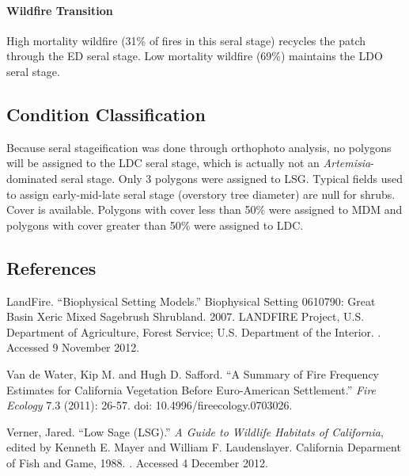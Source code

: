 \paragraph{Wildfire Transition} High mortality wildfire (31\% of fires in this seral stage) recycles the patch through the ED seral stage. Low mortality wildfire (69\%) maintains the LDO seral stage.

\noindent\hrulefill

\subsection*{Condition Classification}
Because seral stageification was done through orthophoto analysis, no polygons will be assigned to the LDC seral stage, which is actually not an \emph{Artemisia}-dominated seral stage. Only 3 polygons were assigned to LSG. Typical fields used to assign early-mid-late seral stage (overstory tree diameter) are null for shrubs. Cover is available. Polygons with cover less than 50\% were assigned to MDM and polygons with cover greater than 50\% were assigned to LDC.


\subsection*{References}

\begin{hangparas}{.25in}{1} 
LandFire. ``Biophysical Setting Models.'' Biophysical Setting 0610790: Great Basin Xeric Mixed Sagebrush Shrubland. 2007. LANDFIRE Project, U.S. Department of Agriculture, Forest Service; U.S. Department of the Interior. . Accessed 9 November 2012.

Van de Water, Kip M. and Hugh D. Safford. ``A Summary of Fire Frequency Estimates for California Vegetation Before Euro-American Settlement.'' \emph{Fire Ecology} 7.3 (2011): 26-57. doi: 10.4996/fireecology.0703026.

Verner, Jared. ``Low Sage (LSG).'' \emph{A Guide to Wildlife Habitats of California}, edited by Kenneth E. Mayer and William F. Laudenslayer. California Deparment of Fish and Game, 1988. . Accessed 4 December 2012.
\end{hangparas}


